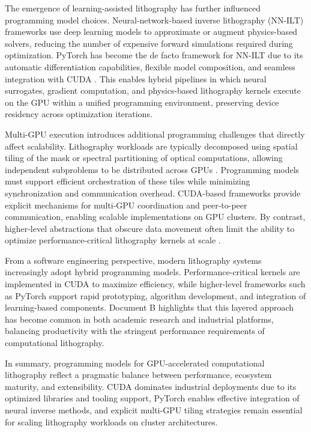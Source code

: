 \documentclass[pdflatex,sn-mathphys-num]{sn-jnl}%
\theoremstyle{thmstyleone}%
\theoremstyle{thmstyletwo}%
\theoremstyle{thmstylethree}%
\begin{document}
The emergence of learning-assisted lithography has further influenced programming model choices. Neural-network-based inverse lithography (NN-ILT) frameworks use deep learning models to approximate or augment physics-based solvers, reducing the number of expensive forward simulations required during optimization. PyTorch has become the de facto framework for NN-ILT due to its automatic differentiation capabilities, flexible model composition, and seamless integration with CUDA \cite{jiang2021neural,Zhang2020}. This enables hybrid pipelines in which neural surrogates, gradient computation, and physics-based lithography kernels execute on the GPU within a unified programming environment, preserving device residency across optimization iterations.

Multi-GPU execution introduces additional programming challenges that directly affect scalability. Lithography workloads are typically decomposed using spatial tiling of the mask or spectral partitioning of optical computations, allowing independent subproblems to be distributed across GPUs \cite{Zheng2023,yang2024gpuacceleratedinverselithographyhigh}. Programming models must support efficient orchestration of these tiles while minimizing synchronization and communication overhead. CUDA-based frameworks provide explicit mechanisms for multi-GPU coordination and peer-to-peer communication, enabling scalable implementations on GPU clusters. By contrast, higher-level abstractions that obscure data movement often limit the ability to optimize performance-critical lithography kernels at scale \cite{yang2024gpuacceleratedinverselithographyhigh}.

From a software engineering perspective, modern lithography systems increasingly adopt hybrid programming models. Performance-critical kernels are implemented in CUDA to maximize efficiency, while higher-level frameworks such as PyTorch \cite{paszke2019pytorch} support rapid prototyping, algorithm development, and integration of learning-based components. Document B highlights that this layered approach has become common in both academic research and industrial platforms, balancing productivity with the stringent performance requirements of computational lithography.

In summary, programming models for GPU-accelerated computational lithography reflect a pragmatic balance between performance, ecosystem maturity, and extensibility. CUDA dominates industrial deployments due to its optimized libraries and tooling support, PyTorch enables effective integration of neural inverse methods, and explicit multi-GPU tiling strategies remain essential for scaling lithography workloads on cluster architectures.
\end{document}
